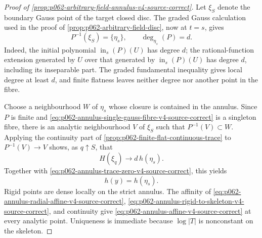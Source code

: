 \begin{proof}[Proof of \cref{prop:p062-arbitrary-field-annulus-v4-source-correct}]
Let \(\xi_S\) denote the boundary Gauss point of the target closed disc.
The graded Gauss calculation used in the proof of
\cref{prop:p062-arbitrary-field-disc}, now at \(t=s\), gives
\begin{equation}\label{eq:p062-annulus-single-gauss-fibre-v4-source-correct}
                      P^{-1}(\xi_S)=\{\eta_s\},
                      \qquad \deg_{\eta_s}(P)=d.
\end{equation}
Indeed, the initial polynomial
\(\operatorname{in}_s(P)(U)\) has degree \(d\); the rational-function
extension generated by \(U\) over that generated by
\(\operatorname{in}_s(P)(U)\) has degree \(d\), including its inseparable
part. The graded fundamental inequality gives local degree at least \(d\),
and finite flatness leaves neither degree nor another point in the fibre.

Choose a neighbourhood \(W\) of \(\eta_s\) whose closure is contained in
the annulus. Since \(P\) is finite and
\eqref{eq:p062-annulus-single-gauss-fibre-v4-source-correct} is a singleton fibre,
there is an analytic neighbourhood \(V\) of \(\xi_S\) such that
\(P^{-1}(V)\subset W\). Applying the continuity part of
\cref{prop:p062-finite-flat-continuous-trace} to
\(P^{-1}(V)\to V\) shows, as \(q\uparrow S\), that
\[
             H(\xi_q)\longrightarrow d\,h(\eta_s).
\]
Together with \eqref{eq:p062-annulus-trace-zero-v4-source-correct}, this yields
\begin{equation}\label{eq:p062-annulus-rigid-to-skeleton-v4-source-correct}
                              h(y)=h(\eta_s).
\end{equation}
Rigid points are dense locally on the strict annulus. The affinity of
\eqref{eq:p062-annulus-radial-affine-v4-source-correct},
\eqref{eq:p062-annulus-rigid-to-skeleton-v4-source-correct}, and continuity give
\eqref{eq:p062-annulus-affine-v4-source-correct} at every analytic point.
Uniqueness is immediate because \(\log|T|\) is nonconstant on the
skeleton.
\end{proof}

